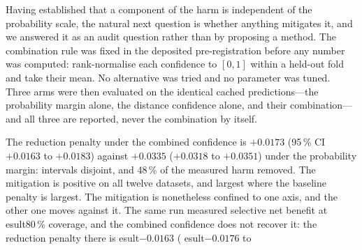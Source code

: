 \documentclass[fleqn,10pt]{wlscirep}
\newcommand{\result}[1]{#1}
\begin{document}
Having established that a component of the harm is independent of the probability scale, the natural
next question is whether anything mitigates it, and we answered it as an audit question rather than
by proposing a method. The combination rule was fixed in the deposited pre-registration before any
number was computed: rank-normalise each confidence to $[0,1]$ within a held-out fold and take their
mean. No alternative was tried and no parameter was tuned. Three arms were then evaluated on the
identical cached predictions---the probability margin alone, the distance confidence alone, and their
combination---and all three are reported, never the combination by itself.

The reduction penalty under the combined confidence is \result{$+0.0173$} (95\,\% CI \result{$+0.0163$}
to \result{$+0.0183$}) against \result{$+0.0335$} (\result{$+0.0318$} to \result{$+0.0351$}) under the
probability margin: intervals disjoint, and \result{48\,\%} of the measured harm removed. The
mitigation is positive on all \result{twelve} datasets, and largest where the baseline penalty is
largest. The mitigation is nonetheless confined to one axis, and the other one moves against it. The same
run measured selective net benefit at 
esult{80\,\%} coverage, and the combined confidence does not
recover it: the reduction penalty there is 
esult{$-0.0163$} (
esult{$-0.0176$} to
\end{document}
